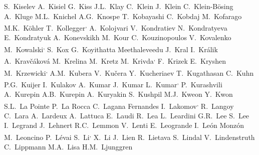 \begin{flushleft}
S.~Kiselev\And
A.~Kisiel\And
G.~Kiss\And
J.L.~Klay\And
C.~Klein\And
J.~Klein\And
C.~Klein-B\"{o}sing\And
A.~Kluge\And
M.L.~Knichel\And
A.G.~Knospe\And
T.~Kobayashi\And
C.~Kobdaj\And
M.~Kofarago\And
M.K.~K\"{o}hler\And
T.~Kollegger\textsuperscript{,}\And
A.~Kolojvari\And
V.~Kondratiev\And
N.~Kondratyeva\And
E.~Kondratyuk\And
A.~Konevskikh\And
M.~Kour\And
C.~Kouzinopoulos\And
V.~Kovalenko\And
M.~Kowalski\textsuperscript{,}\And
S.~Kox\And
G.~Koyithatta Meethaleveedu\And
J.~Kral\And
I.~Kr\'{a}lik\And
A.~Krav\v{c}\'{a}kov\'{a}\And
M.~Krelina\And
M.~Kretz\And
M.~Krivda\textsuperscript{,}\And
F.~Krizek\And
E.~Kryshen\And
M.~Krzewicki\textsuperscript{,}\And
A.M.~Kubera\And
V.~Ku\v{c}era\And
Y.~Kucheriaev\And
T.~Kugathasan\And
C.~Kuhn\And
P.G.~Kuijer\And
I.~Kulakov\And
A.~Kumar\And
J.~Kumar\And
L.~Kumar\textsuperscript{,}\And
P.~Kurashvili\And
A.~Kurepin\And
A.B.~Kurepin\And
A.~Kuryakin\And
S.~Kushpil\And
M.J.~Kweon\And
Y.~Kwon\And
S.L.~La Pointe\And
P.~La Rocca\And
C.~Lagana Fernandes\And
I.~Lakomov\textsuperscript{,}\And
R.~Langoy\And
C.~Lara\And
A.~Lardeux\And
A.~Lattuca\And
E.~Laudi\And
R.~Lea\And
L.~Leardini\And
G.R.~Lee\And
S.~Lee\And
I.~Legrand\And
J.~Lehnert\And
R.C.~Lemmon\And
V.~Lenti\And
E.~Leogrande\And
I.~Le\'{o}n Monz\'{o}n\And
M.~Leoncino\And
P.~L\'{e}vai\And
S.~Li\textsuperscript{,}\And
X.~Li\And
J.~Lien\And
R.~Lietava\And
S.~Lindal\And
V.~Lindenstruth\And
C.~Lippmann\And
M.A.~Lisa\And
H.M.~Ljunggren\And

\end{flushleft}
